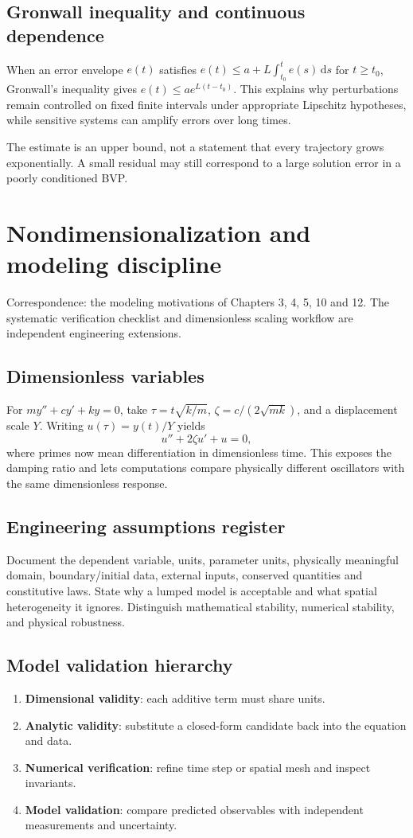 \documentclass[11pt,letterpaper,oneside]{report}
\theoremstyle{definition}\newtheorem{definition}[theorem]{Definition}
\theoremstyle{remark}\newtheorem{remark}[theorem]{Remark}
\newcommand{\dd}{\,\mathrm{d}}
\begin{document}
\section{Gronwall inequality and continuous dependence}
When an error envelope $e(t)$ satisfies $e(t)\le a+L\int_{t_0}^t e(s)\dd s$ for $t\ge t_0$, Gronwall's inequality gives $e(t)\le ae^{L(t-t_0)}$. This explains why perturbations remain controlled on fixed finite intervals under appropriate Lipschitz hypotheses, while sensitive systems can amplify errors over long times.
\begin{caution}The estimate is an upper bound, not a statement that every trajectory grows exponentially. A small residual may still correspond to a large solution error in a poorly conditioned BVP.\end{caution}
\chapter{Nondimensionalization and modeling discipline}
\begin{bookground}Correspondence: the modeling motivations of Chapters 3, 4, 5, 10 and 12. The systematic verification checklist and dimensionless scaling workflow are independent engineering extensions.\end{bookground}
\section{Dimensionless variables}
For $m y''+c y'+ky=0$, take $\tau=t\sqrt{k/m}$, $\zeta=c/(2\sqrt{mk})$, and a displacement scale $Y$. Writing $u(\tau)=y(t)/Y$ yields
\[u''+2\zeta u'+u=0,\]
where primes now mean differentiation in dimensionless time. This exposes the damping ratio and lets computations compare physically different oscillators with the same dimensionless response.
\section{Engineering assumptions register}
Document the dependent variable, units, parameter units, physically meaningful domain, boundary/initial data, external inputs, conserved quantities and constitutive laws. State why a lumped model is acceptable and what spatial heterogeneity it ignores. Distinguish mathematical stability, numerical stability, and physical robustness.
\section{Model validation hierarchy}
\begin{enumerate}
\item \textbf{Dimensional validity}: each additive term must share units.
\item \textbf{Analytic validity}: substitute a closed-form candidate back into the equation and data.
\item \textbf{Numerical verification}: refine time step or spatial mesh and inspect invariants.
\item \textbf{Model validation}: compare predicted observables with independent measurements and uncertainty.
\end{enumerate}
\end{document}
